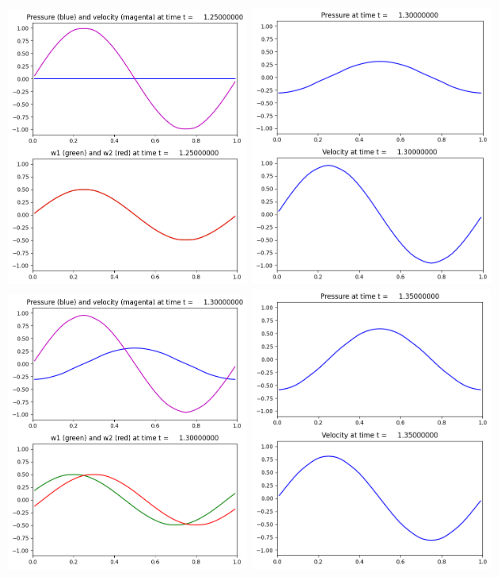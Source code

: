 \documentclass[11pt]{article}
\begin{document}
\includegraphics[width=0.475\textwidth]{frame0025fig2.png}
\vskip 10pt 
\includegraphics[width=0.475\textwidth]{frame0026fig1.png}
\includegraphics[width=0.475\textwidth]{frame0026fig2.png}
\vskip 10pt 
\includegraphics[width=0.475\textwidth]{frame0027fig1.png}
\end{document}
